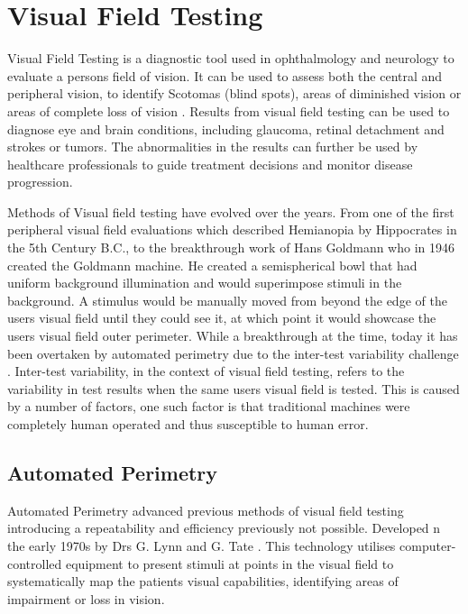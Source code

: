 \documentclass{l4proj}
\begin{document}
\section{Visual Field Testing}
Visual Field Testing is a diagnostic tool used in ophthalmology and neurology to evaluate a persons field of vision. It can be used to assess both the central and peripheral vision, to identify Scotomas (blind spots), areas of diminished vision or areas of complete loss of vision \citep{AAO2021VisualField}. Results from visual field testing can be used to diagnose eye and brain conditions, including glaucoma, retinal detachment and strokes or tumors. The abnormalities in the results can further be used by healthcare professionals to guide treatment decisions and monitor disease progression. 

Methods of Visual field testing have evolved over the years. From one of the first peripheral visual field evaluations which described Hemianopia by Hippocrates \citep{Johnson2011Perimetry} in the 5th Century B.C., to the breakthrough work of Hans Goldmann who in 1946 created the Goldmann machine. He created a semispherical bowl that had uniform background illumination and would superimpose stimuli in the background. A stimulus would be manually moved from beyond the edge of the users visual field until they could see it, at which point it would showcase the users visual field outer perimeter. While a breakthrough at the time, today it has been overtaken by automated perimetry due to the inter-test variability challenge \citep{CarrollJohnsonVFTutorial2021}. Inter-test variability, in the context of visual field testing, refers to the variability in test results when the same users visual field is tested. This is caused by a number of factors, one such factor is that traditional machines were completely human operated and thus susceptible to human error.




\subsection{Automated Perimetry}
Automated Perimetry advanced previous methods of visual field testing introducing a repeatability and efficiency previously not possible. Developed n the early 1970s by Drs G. Lynn and G. Tate \citep{HKMJ2023}. This technology utilises computer-controlled equipment to present stimuli at points in the visual field to systematically map the patients visual capabilities, identifying areas of impairment or loss in vision.
\end{document}
